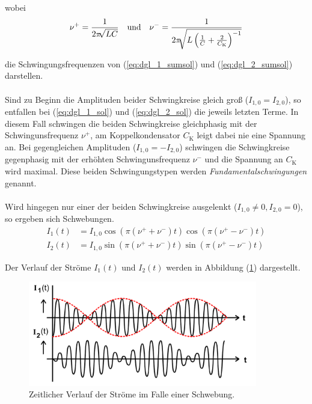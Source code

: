 wobei 
\begin{align} \label{eq:resonanzfrequenzen}
    \nu^+ &= \frac {1} {2 \pi \sqrt[]{LC}} & \mbox{\centering und} && \nu^- = \frac {1} {2 \pi \sqrt [] {L \left( \frac{1}{C} + \frac{2}{C_\text{K}} \right)^{-1} }}
\end{align}

die Schwingungsfrequenzen von (\ref{eq:dgl_1_sumsol}) und (\ref{eq:dgl_2_sumsol}) darstellen. \\
\\
Sind zu Beginn die Amplituden beider Schwingkreise gleich groß ($I_{1,0} = I_{2,0}$), so entfallen bei (\ref{eq:dgl_1_sol}) und (\ref{eq:dgl_2_sol})
die jeweils letzten Terme. In diesem Fall schwingen die beiden Schwingkreise gleichphasig mit der Schwingunsfrequenz $\nu^+$, am
Koppelkondensator $C_\text{K}$ leigt dabei nie eine Spannung an. Bei gegengleichen Amplituden ($I_{1,0} = -I_{2,0}$) schwingen die Schwingkreise gegenphasig
mit der erhöhten Schwingunsfrequenz $\nu^-$ und die Spannung an $C_\text{K}$ wird maximal. Diese beiden Schwingungstypen werden \textit{Fundamentalschwingungen} genannt. \\
\\
Wird hingegen nur einer der beiden Schwingkreise ausgelenkt ($I_{1,0} \neq 0, I_{2,0} = 0$), so ergeben sich Schwebungen.
\begin{align}
    I_{1}(t) &= I_{1,0} \cos(\pi (\nu^+ + \nu^-) t) \cos(\pi (\nu^+ - \nu^-) t) \label{eq:dgl_1_sol_schweb} \\
    I_{2}(t) &= I_{1,0} \sin(\pi (\nu^+ + \nu^-) t) \sin(\pi (\nu^+ - \nu^-) t) \label{eq:dgl_2_sol_schweb} 
\end{align}

Der Verlauf der Ströme $I_{1}(t)$ und $I_{2}(t)$ werden in Abbildung (\ref{fig:schwebung}) dargestellt.
\begin{figure} 
    \centering
    \includegraphics[width=10cm] {pictures/schwebung.png} 
    \caption{Zeitlicher Verlauf der Ströme im Falle einer Schwebung. \cite{v355}}
    \label{fig:schwebung}
\end{figure} 

